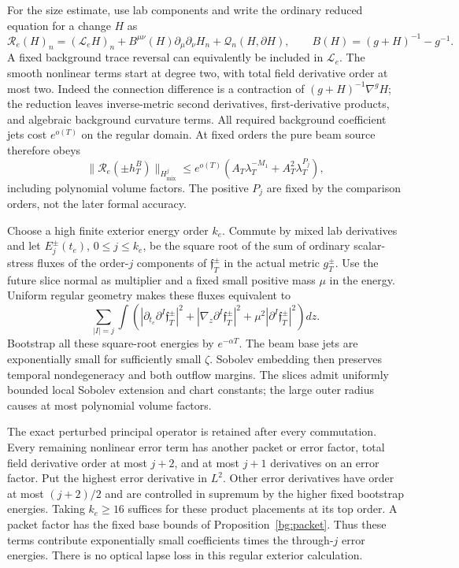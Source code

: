 For the size estimate, use lab components and write the ordinary
reduced equation for a change $H$ as
\begin{equation}\label{prep:exterior-equation}
 \mathcal R_e(H)_n=(\mathcal L_eH)_n
  +B^{\mu\nu}(H)\partial_\mu\partial_\nu H_n
  +\mathcal Q_n(H,\partial H),\qquad
 B(H)=(g+H)^{-1}-g^{-1}.
\end{equation}
A fixed background trace reversal can equivalently be included in
$\mathcal L_e$.  The smooth nonlinear terms start at degree two,
with total field derivative order at most two.  Indeed the
connection difference is a contraction of
$(g+H)^{-1}\nabla^gH$; the reduction leaves inverse-metric second
derivatives, first-derivative products, and algebraic background
curvature terms.  All required background coefficient jets cost
$e^{o(T)}$ on the regular domain.  At fixed orders the pure beam
source therefore obeys
\begin{equation}\label{prep:beam-nonlinear-residual}
 \|\mathcal R_e(\pm h_T^B)\|_{H^j_{\mathrm{mix}}}
 \le e^{o(T)}\left(A_T\lambda_T^{-M_1}
                           +A_T^2\lambda_T^{P_j}\right),
\end{equation}
including polynomial volume factors.  The positive $P_j$ are
fixed by the comparison orders, not the later formal accuracy.

Choose a high finite exterior energy order $k_e$.  Commute by mixed
lab derivatives and let $E_j^\pm(t_e)$, $0\le j\le k_e$, be the
square root of the sum of ordinary scalar-stress fluxes of the
order-$j$ components of $\mathfrak f_T^\pm$ in the actual metric
$g_T^\pm$.  Use the future slice normal as multiplier and a fixed
small positive mass $\mu$ in the energy.  Uniform regular geometry
makes these fluxes equivalent to
\[
 \sum_{|I|=j}\int\left(
   |\partial_{t_e}\partial^I\mathfrak f_T^\pm|^2
  +|\nabla_z\partial^I\mathfrak f_T^\pm|^2
  +\mu^2|\partial^I\mathfrak f_T^\pm|^2\right)dz.
\]
Bootstrap all these square-root energies by $e^{-\alpha T}$.
The beam base jets are exponentially small for sufficiently small
$\zeta$.  Sobolev embedding then preserves temporal
nondegeneracy and both outflow margins.  The slices admit uniformly
bounded local Sobolev extension and chart constants; the large
outer radius causes at most polynomial volume factors.

The exact perturbed principal operator is retained after every
commutation.  Every remaining nonlinear error term has another
packet or error factor, total field derivative order at most
$j+2$, and at most $j+1$ derivatives on an error factor.  Put the
highest error derivative in $L^2$.  Other error derivatives have
order at most $(j+2)/2$ and are controlled in supremum by the
higher fixed bootstrap energies.  Taking $k_e\ge16$ suffices for
these product placements at its top order.  A packet factor has
the fixed base bounds of Proposition~\ref{bg:packet}.  Thus these
terms contribute exponentially small coefficients times the
through-$j$ error energies.  There is no optical lapse loss in
this regular exterior calculation.

